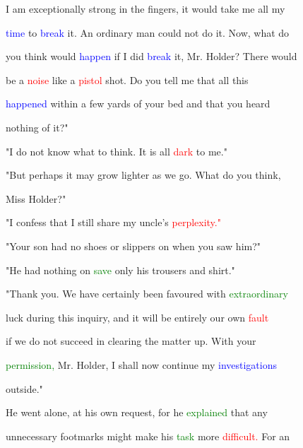  I am exceptionally strong in the fingers, it would take me all my

 \textcolor{blue}{time} to \textcolor{blue}{break} it. An ordinary man could not do it. Now, what do

 you think would \textcolor{blue}{happen} if I did \textcolor{blue}{break} it, Mr. Holder? There would

 be a \textcolor{red}{noise} like a \textcolor{red}{pistol} \textcolor{BurntOrange}{shot.} Do you tell me that all this

 \textcolor{blue}{happened} within a few yards of your bed and that you heard

 nothing of it?"



 "I do not know what to think. It is all \textcolor{red}{dark} to me."



 "But perhaps it may \textcolor{BurntOrange}{grow} lighter as we go. What do you think,

 Miss Holder?"



 "I \textcolor{BurntOrange}{confess} that I still \textcolor{BurntOrange}{share} my uncle's \textcolor{red}{perplexity."}



 "Your son had no shoes or slippers on when you saw him?"



 "He had nothing on \textcolor{green}{save} only his trousers and shirt."



 "Thank you. We have certainly been favoured with \textcolor{green}{extraordinary}

 \textcolor{BurntOrange}{luck} during this \textcolor{BurntOrange}{inquiry,} and it will be entirely our own \textcolor{red}{fault}

 if we do not \textcolor{BurntOrange}{succeed} in clearing the matter up. With your

 \textcolor{green}{permission,} Mr. Holder, I shall now \textcolor{BurntOrange}{continue} my \textcolor{blue}{investigations}

 outside."



 He went alone, at his own request, for he \textcolor{green}{explained} that any

 unnecessary footmarks might make his \textcolor{green}{task} more \textcolor{red}{difficult.} For an

